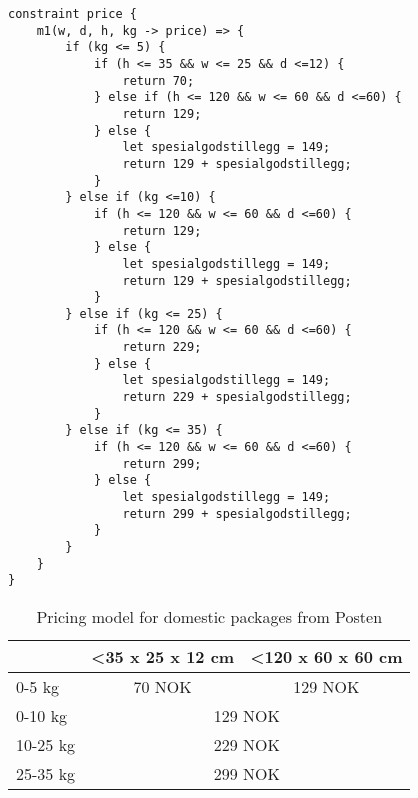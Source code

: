 \begin{lstlisting}[caption={HotDrink logic for determining the price},label=hotdrinkprice, language=hotdrink]
constraint price {
    m1(w, d, h, kg -> price) => {
        if (kg <= 5) {
            if (h <= 35 && w <= 25 && d <=12) {
                return 70;
            } else if (h <= 120 && w <= 60 && d <=60) {
                return 129;
            } else {
                let spesialgodstillegg = 149;
                return 129 + spesialgodstillegg;
            }
        } else if (kg <=10) {
            if (h <= 120 && w <= 60 && d <=60) {
                return 129;
            } else {
                let spesialgodstillegg = 149;
                return 129 + spesialgodstillegg;
            }
        } else if (kg <= 25) {
            if (h <= 120 && w <= 60 && d <=60) {
                return 229;
            } else {
                let spesialgodstillegg = 149;
                return 229 + spesialgodstillegg;
            }
        } else if (kg <= 35) {
            if (h <= 120 && w <= 60 && d <=60) {
                return 299;
            } else {
                let spesialgodstillegg = 149;
                return 299 + spesialgodstillegg;
            }
        }
    }
}
\end{lstlisting}

\begin{table}[h]
    \centering
    \caption{Pricing model for domestic packages from Posten}
    \label{pricingmodel}
    \begin{tabular}{|l|cl|}
    \hline
             & \multicolumn{1}{l|}{\textless 35 x 25 x 12 cm} & \textless 120 x 60 x 60 cm    \\ \hline
    0-5 kg   & \multicolumn{1}{c|}{70 NOK}                     & \multicolumn{1}{c|}{129 NOK} \\ \hline
    0-10 kg  & \multicolumn{2}{c|}{129 NOK}                                                   \\ \hline
    10-25 kg & \multicolumn{2}{c|}{229 NOK}                                                   \\ \hline
    25-35 kg & \multicolumn{2}{c|}{299 NOK}                                                   \\ \hline
    \end{tabular}
\end{table}

